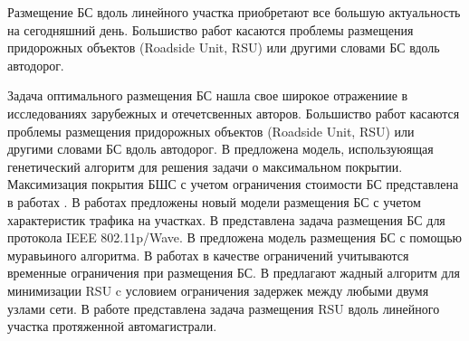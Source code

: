 





Размещение БС вдоль линейного участка приобретают все большую актуальность на сегодняшний день. Большиство работ касаются проблемы размещения придорожных объектов (Roadside Unit, RSU) или другими словами БС вдоль автодорог. 

Задача оптимального размещения БС нашла свое широкое отражениие в исследованиях зарубежных и отечетсвенных авторов. Большиство работ касаются проблемы размещения придорожных объектов (Roadside Unit, RSU) или другими словами БС вдоль автодорог. В \cite{Cavalcante2012} предложена модель, используюящая генетический алгоритм для решения задачи о максимальном покрытии. Максимизация покрытия БШС с учетом ограничения стоимости БС представлена в работах \cite{BenBrahim2014, Vishnevsky2016_optimization}. В работах \cite{Liu2014, Gao2018, Jalooli2019} предложены новый модели размещения БС с учетом характеристик трафика на участках. В \cite{Reis2014} представлена задача размещения БС для протокола IEEE 802.11p/Wave. В \cite{Guerna2021} предложена модель размещения БС с помощью муравьиного алгоритма. В работах \cite{Cavalcante2012, Liu2017} в качестве ограничений учитываются временные ограничения при размещения БС. В \cite{Bao2018} предлагают жадный алгоритм для минимизации RSU c условием ограничения задержек между любыми двумя узлами сети. В работе \cite{Ivanov2018} представлена задача размещения RSU вдоль линейного участка протяженной автомагистрали. 


